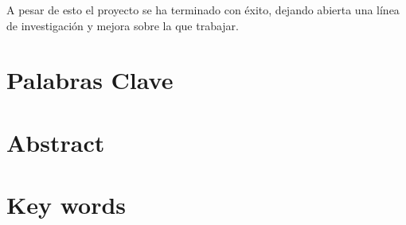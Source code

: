 A pesar de esto el proyecto se ha terminado con éxito, dejando abierta una línea de investigación y mejora sobre la que trabajar.


\section*{Palabras Clave}

\newpage

\section*{Abstract}


\section*{Key words}
